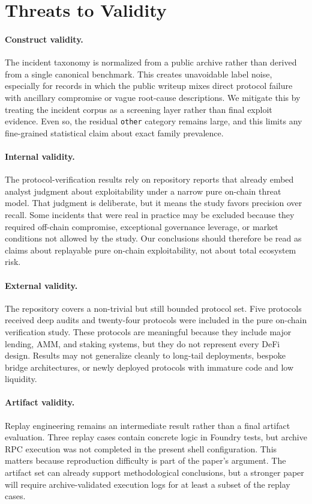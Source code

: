 \section{Threats to Validity}
\label{sec:threats}

\paragraph{Construct validity.}
The incident taxonomy is normalized from a public archive rather than derived from a single canonical benchmark. This creates unavoidable label noise, especially for records in which the public writeup mixes direct protocol failure with ancillary compromise or vague root-cause descriptions. We mitigate this by treating the incident corpus as a screening layer rather than final exploit evidence. Even so, the residual \texttt{other} category remains large, and this limits any fine-grained statistical claim about exact family prevalence.

\paragraph{Internal validity.}
The protocol-verification results rely on repository reports that already embed analyst judgment about exploitability under a narrow pure on-chain threat model. That judgment is deliberate, but it means the study favors precision over recall. Some incidents that were real in practice may be excluded because they required off-chain compromise, exceptional governance leverage, or market conditions not allowed by the study. Our conclusions should therefore be read as claims about replayable pure on-chain exploitability, not about total ecosystem risk.

\paragraph{External validity.}
The repository covers a non-trivial but still bounded protocol set. Five protocols received deep audits and twenty-four protocols were included in the pure on-chain verification study. These protocols are meaningful because they include major lending, AMM, and staking systems, but they do not represent every DeFi design. Results may not generalize cleanly to long-tail deployments, bespoke bridge architectures, or newly deployed protocols with immature code and low liquidity.

\paragraph{Artifact validity.}
Replay engineering remains an intermediate result rather than a final artifact evaluation. Three replay cases contain concrete logic in Foundry tests, but archive RPC execution was not completed in the present shell configuration. This matters because reproduction difficulty is part of the paper's argument. The artifact set can already support methodological conclusions, but a stronger paper will require archive-validated execution logs for at least a subset of the replay cases.
